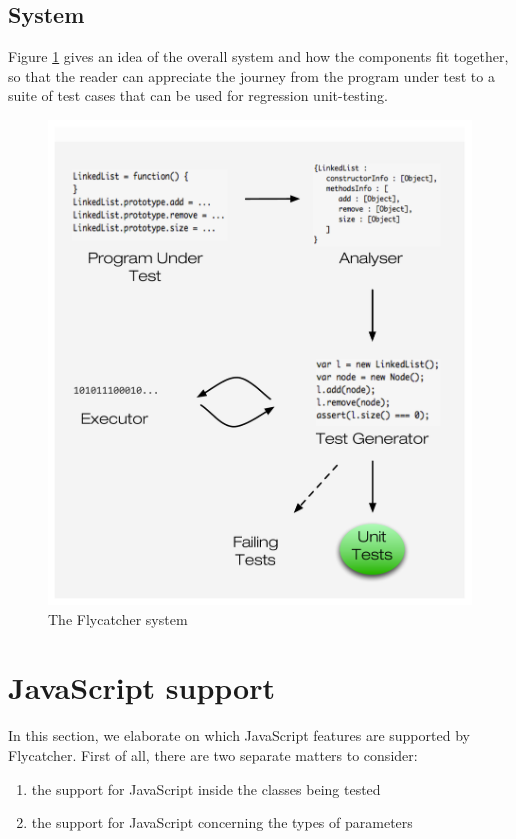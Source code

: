\subsection{System}
Figure \ref{system} gives an idea of the overall system and how the components fit together, so that the reader can appreciate the journey from the program under test to a suite of test cases that can be used for regression unit-testing.

\begin{figure}[h]
\centering
\includegraphics[scale=0.55]{./components/chapter3/system10.pdf}
\caption{The \textsf{Flycatcher} system}
\label{system}
\end{figure}

\section{JavaScript support}
In this section, we elaborate on which JavaScript features are supported by \textsf{Flycatcher}. First of all, there are two separate matters to consider:

\begin{enumerate}
   \item the support for JavaScript inside the classes being tested
   \item the support for JavaScript concerning the types of parameters
\end{enumerate}

